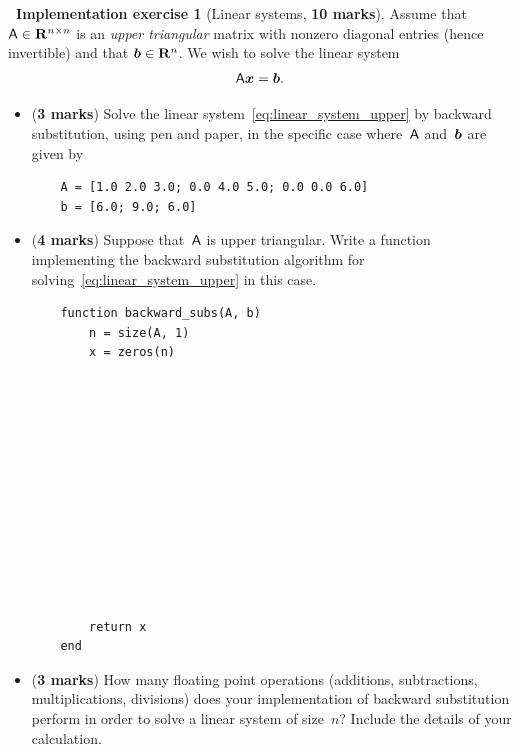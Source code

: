 \documentclass[10pt]{article}
\theoremstyle{definition}
\newtheorem{compexercise}{{\normalfont \faLaptop}~Implementation exercise}
\renewcommand{\mymarks}[1]{\textbf{#1 marks}}
\begin{document}
\newpage
\begin{compexercise}
    [Linear systems, \mymarks{10}]
    Assume that $\mathsf A \in \mathbf R^{n \times n}$ is an \emph{upper triangular} matrix with nonzero diagonal entries (hence invertible) and that $\mathbf{\boldsymbol{b}} \in \mathbf R^n$.
    We wish to solve the linear system
    \begin{equation}
        \label{eq:linear_system_upper}
        \mathsf A \mathbf{\boldsymbol{x}} = \mathbf{\boldsymbol{b}}.
    \end{equation}
    \begin{itemize}
        \item
            (\mymarks{3})
            Solve the linear system~\eqref{eq:linear_system_upper} by backward substitution,
            using pen and paper, in the specific case where~$\mathsf A$ and~$\mathbf{\boldsymbol{b}}$ are given by
            \begin{verbatim}
    A = [1.0 2.0 3.0; 0.0 4.0 5.0; 0.0 0.0 6.0]
    b = [6.0; 9.0; 6.0]
            \end{verbatim}
            \vspace{6cm}
        \item
            (\mymarks{4})
            Suppose that~$\mathsf A$ is upper triangular.
            Write a function  implementing the backward substitution algorithm for solving~\eqref{eq:linear_system_upper} in this case.
            \begin{verbatim}
    function backward_subs(A, b)
        n = size(A, 1)
        x = zeros(n)













        return x
    end
            \end{verbatim}

        \item
            (\mymarks{3})
            How many floating point operations (additions, subtractions, multiplications, divisions) does your implementation of backward substitution perform in order to solve a linear system of size~$n$?
            Include the details of your calculation.

            \vspace{5cm}


\end{itemize}
\end{compexercise}
\end{document}
